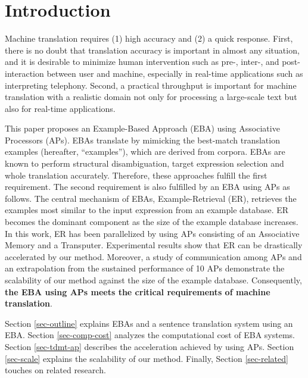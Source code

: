 

\renewcommand{\topfraction}{}
\renewcommand{\textfraction}{}




\maketitle
\thispagestyle{bothstyle}

\section{Introduction}\label{sec-intro}

Machine translation requires (1) high accuracy and 
(2) a quick response.
First, there is no doubt that translation accuracy is 
important in almost any situation,
and it is desirable to minimize human intervention such as pre-, inter-, 
and post-interaction between user and machine, especially 
in real-time applications
such as interpreting telephony.
Second, a practical throughput is important for machine translation 
with a realistic domain 
not only for processing a large-scale text
but also for real-time applications.

This paper proposes an Example-Based Approach (EBA) 
using Associative Processors (APs).
EBAs translate by mimicking the best-match 
translation examples (hereafter, ``examples''), which are derived from corpora.
EBAs are known to  perform structural disambiguation, target expression
selection and  whole translation  accurately.
Therefore, these approaches fulfill the first requirement.
The second requirement is also fulfilled by an EBA using APs as follows.
The central mechanism of EBAs, Example-Retrieval (ER),  retrieves 
the examples most similar to the input expression from an example database.
ER becomes the dominant component
as  the size of the example database increases.
In this work, ER has been parallelized
by using APs consisting of an Associative Memory and a 
Transputer.
Experimental results show that ER can be
drastically accelerated by our method.
Moreover, a study of communication among APs and 
an extrapolation from  the sustained performance of 10 APs
demonstrate the scalability of our method against the size of 
the example database.
Consequently, {\bf the EBA using APs meets the critical requirements of 
machine translation}.

Section \ref{sec-outline} explains 
EBAs and a  sentence translation system 
using an EBA.
Section \ref{sec-comp-cost} analyzes
the computational cost of EBA systems.
Section \ref{sec-tdmt-ap} describes the acceleration achieved  by using APs. 
Section \ref{sec-scale} explains the scalability of our method.
Finally, Section \ref{sec-related} touches on related research.

